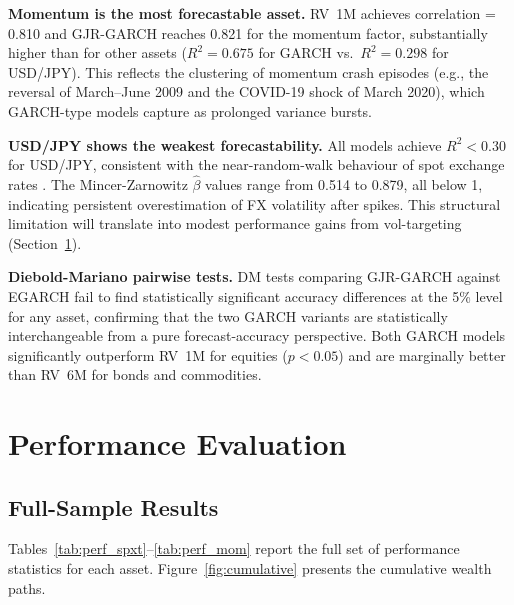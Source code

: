 \documentclass[12pt, a4paper]{article}
\begin{document}
\textbf{Momentum is the most forecastable asset.} RV~1M achieves correlation = 0.810 and
GJR-GARCH reaches 0.821 for the momentum factor, substantially higher than for other
assets ($R^2 = 0.675$ for GARCH vs.\ $R^2 = 0.298$ for USD/JPY). This reflects the
clustering of momentum crash episodes (e.g., the reversal of March--June 2009 and the
COVID-19 shock of March 2020), which GARCH-type models capture as prolonged variance
bursts.

\textbf{USD/JPY shows the weakest forecastability.} All models achieve $R^2 < 0.30$ for
USD/JPY, consistent with the near-random-walk behaviour of spot exchange rates
\citep{Meese1983}. The Mincer-Zarnowitz $\hat{\beta}$ values range from 0.514 to 0.879,
all below 1, indicating persistent overestimation of FX volatility after spikes. This
structural limitation will translate into modest performance gains from vol-targeting
(Section~\ref{sec:performance}).

\textbf{Diebold-Mariano pairwise tests.} DM tests comparing GJR-GARCH against EGARCH
fail to find statistically significant accuracy differences at the 5\% level for any
asset, confirming that the two GARCH variants are statistically interchangeable from a
pure forecast-accuracy perspective. Both GARCH models significantly outperform RV~1M for
equities ($p < 0.05$) and are marginally better than RV~6M for bonds and commodities.


\section{Performance Evaluation}
\label{sec:performance}

\subsection{Full-Sample Results}

Tables~\ref{tab:perf_spxt}--\ref{tab:perf_mom} report the full set of performance
statistics for each asset. Figure~\ref{fig:cumulative} presents the cumulative wealth paths.
\end{document}
